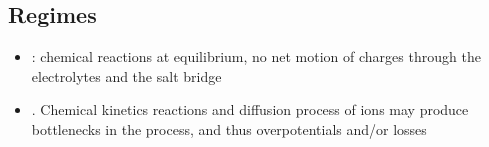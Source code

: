 \documentclass[letterpaper,10pt,english]{jupyterBook}
\begin{document}
\subsection{Regimes}
\label{\detokenize{ch/batteries-daniell:regimes}}\label{\detokenize{ch/batteries-daniell:electro-chemical-batteries-daniell-regimes}}\begin{itemize}
\item {} 
\sphinxAtStartPar
{\hyperref[\detokenize{ch/batteries-daniell:electro-chemical-batteries-daniell-regimes-open}]{}}: chemical reactions at equilibrium, no net motion of charges through the electrolytes and the salt bridge

\item {} 
\sphinxAtStartPar
{\hyperref[\detokenize{ch/batteries-daniell:electro-chemical-batteries-daniell-regimes-load}]{}}. Chemical kinetics reactions and diffusion process of ions may produce bottlenecks in the process, and thus overpotentials and/or losses

\end{itemize}
\end{document}
